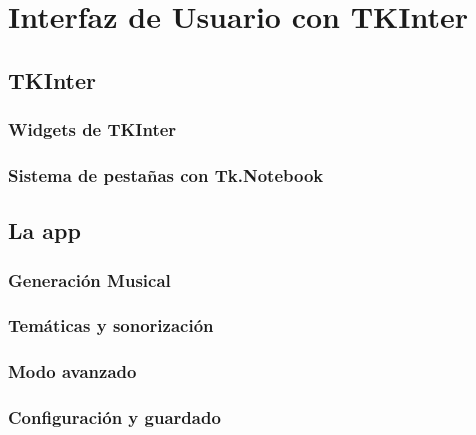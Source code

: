 \chapter{Interfaz de Usuario con TKInter}
\label{cap:GUIconTKInter}

\section{TKInter}
\subsection{Widgets de TKInter}
\subsection{Sistema de pestañas con Tk.Notebook}

\section{La app}
\subsection{Generación Musical}
\subsection{Temáticas y sonorización}
\label{subsec:TematicasYSonorizacion}
\subsection{Modo avanzado}

\subsection{Configuración y guardado}
